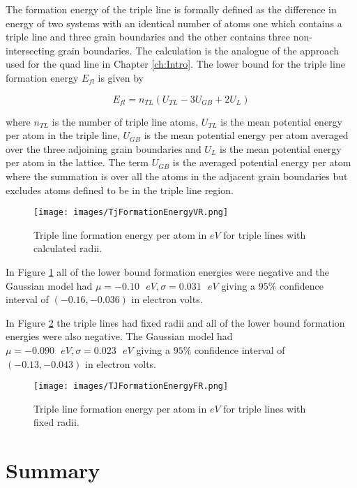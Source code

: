 \documentclass[12pt,a4paper,openany]{report}
\begin{document}
The formation energy of the triple line is formally defined as the difference in energy of two systems with an identical number of atoms one which contains a triple line and three grain boundaries and the other contains three non-intersecting grain boundaries. The calculation is the analogue of the approach used for the quad line in Chapter \ref{ch:Intro}. The lower bound for the triple line formation energy $E_{fl}$ is given by

\[ E_{fl} = n_{TL}\left(U_{TL} -3U_{GB} + 2U_{L} \right) \]
 
where $n_{TL}$ is the number of triple line atoms, $U_{TL}$ is the mean potential energy per atom in the triple line,  $U_{GB}$ is the mean potential energy per atom averaged over the three adjoining grain boundaries and $U_{L}$ is the mean potential energy per atom in the lattice. The term $U_{GB}$ is the averaged potential energy per atom where the summation is over all the atoms in the adjacent grain boundaries but excludes atoms defined to be in the triple line region.
  

\begin{figure}[H]
	\texttt{[image: images/TjFormationEnergyVR.png]} 
	\caption{Triple line formation energy per atom in $eV$ for triple lines with calculated radii.}
	\label{fig:FormationEnergyVR}
\end{figure}

In Figure \ref{fig:FormationEnergyVR} all of the lower bound formation energies were negative and the Gaussian model had  $\mu = -0.10 \text{ } eV, \sigma = 0.031 \text{ } eV$ giving a $95\%$ confidence interval of $(-0.16,  -0.036)$ in electron volts.

In Figure \ref{fig:FormationEnergyFR} the triple lines had fixed radii and all of the lower bound formation energies were also negative. The Gaussian model had  $\mu = -0.090 \text{ } eV, \sigma = 0.023 \text{ } eV$ giving a $95\%$ confidence interval of $(-0.13,  -0.043)$ in electron volts.


\begin{figure}[H]
	\texttt{[image: images/TJFormationEnergyFR.png]} 
	\caption{Triple line formation energy per atom in $eV$ for triple lines with fixed radii.}
	\label{fig:FormationEnergyFR}
\end{figure}



\newpage


\chapter{Summary} \label{ch:Summary}
\end{document}
